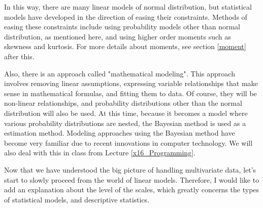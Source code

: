 \documentclass{ltjsbook}
\begin{document}
In this way, there are many linear models of normal distribution, but statistical models have developed in the direction of easing their constraints. Methods of easing these constraints include using probability models other than normal distribution, as mentioned here, and using higher order moments such as skewness and kurtosis. For more details about moments, see section \ref{moment} after this.

Also, there is an approach called "mathematical modeling". This approach involves removing linear assumptions, expressing variable relationships that make sense in mathematical formulas, and fitting them to data. Of course, they will be non-linear relationships, and probability distributions other than the normal distribution will also be used. At this time, because it becomes a model where various probability distributions are nested, the Bayesian method is used as a estimation method. Modeling approaches using the Bayesian method have become very familiar due to recent innovations in computer technology. We will also deal with this in class from Lecture \ref{x16_Programming}.

Now that we have understood the big picture of handling multivariate data, let's start to slowly proceed from the world of linear models. Therefore, I would like to add an explanation about the level of the scales, which greatly concerns the types of statistical models, and descriptive statistics.
\end{document}
